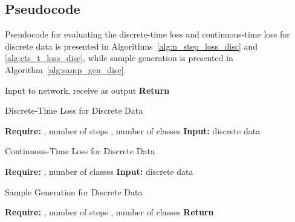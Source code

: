 \documentclass[11pt,table]{article}
\newcommand{\0}[1]{\constvec{0}{#1}}
\newcommand{\1}[1]{\constvec{1}{#1}}
\begin{document}
\subsection{Pseudocode}
Pseudocode for evaluating the discrete-time loss  and continuous-time loss  for discrete data is presented in Algorithms~\ref{alg:n_step_loss_disc} and \ref{alg:cts_t_loss_disc}, while sample generation is presented in Algorithm~\ref{alg:samp_gen_disc}.
\begin{algorithm}[H]
\begin{algorithmic}
\State Input  to network, receive  as output
\For{}
\If{}
\State 
\State 
\Else
\State 
\EndIf
\EndFor
\State \textbf{Return} 
\EndFunction
\end{algorithmic}
\end{algorithm}
\begin{algorithm}[H]
\caption{Discrete-Time Loss  for Discrete Data}\label{alg:n_step_loss_disc}
\begin{algorithmic}
\State \textbf{Require:} , number of steps , number of classes 
\State \textbf{Input:} discrete data 
\State 
\State 
\State 
\State 
\State 
\State 
\State 
\State 
\State 
\end{algorithmic}
\end{algorithm}
\begin{algorithm}[H]
\caption{Continuous-Time Loss  for Discrete Data}\label{alg:cts_t_loss_disc}
\begin{algorithmic}
\State \textbf{Require:} , number of classes 
\State \textbf{Input:} discrete data 
\State 
\State 
\State 
\State 
\State 
\State 
\State 
\end{algorithmic}
\end{algorithm}
\begin{algorithm}[H]
\caption{Sample Generation for Discrete Data}\label{alg:samp_gen_disc}
\begin{algorithmic}
\State \textbf{Require:} , number of steps , number of classes 
\State 
{} 
    \State 
    \State 
    \State 
    \State 
    \State 
    \State 
\EndFor
\State 
\State \textbf{Return} 
\end{algorithmic}
\end{algorithm}
\end{document}
